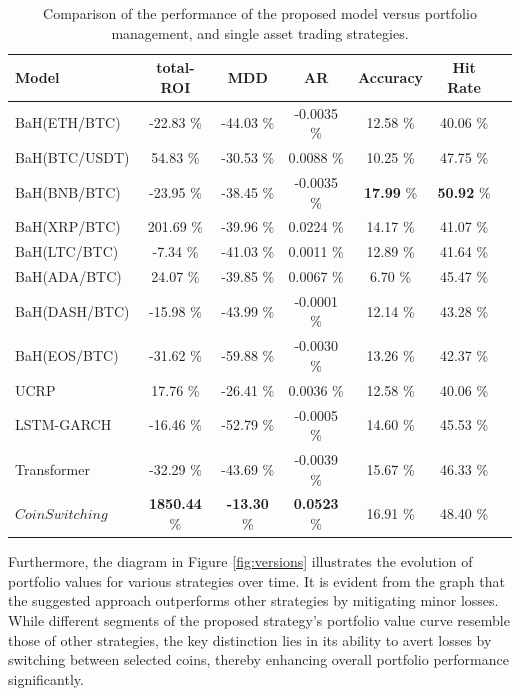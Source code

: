 \begin{table}[h]
	\centering
	\caption{Comparison of the performance of the proposed model versus portfolio management, and single asset trading strategies.}
	\label{tbl:cmp}
	\begin{tabular}{l| c | c | c | c | c | c  }
		 Model & total-ROI & MDD & AR & Accuracy & Hit Rate\\
		\hline
		\hline
		 BaH(ETH/BTC) & -22.83 \%  & -44.03 \% & -0.0035 \% & 12.58 \% & 40.06 \% \\
										 BaH(BTC/USDT) & 54.83 \%  & -30.53 \% &  0.0088 \% & 10.25 \% & 47.75 \% \\
										 BaH(BNB/BTC) & -23.95 \%  & -38.45 \% &  -0.0035 \% & \textbf{17.99} \% & \textbf{50.92} \% \\
										 BaH(XRP/BTC) & 201.69 \%  & -39.96 \% & 0.0224 \% & 14.17 \% & 41.07 \% \\
										 BaH(LTC/BTC) & -7.34 \%  & -41.03 \% &  0.0011 \% & 12.89 \% & 41.64 \% \\
										 BaH(ADA/BTC) & 24.07 \%  & -39.85 \% &  0.0067 \% & 6.70 \% & 45.47 \% \\
										 BaH(DASH/BTC) & -15.98 \%  & -43.99 \% &  -0.0001 \% & 12.14 \% & 43.28 \% \\
										 BaH(EOS/BTC) & -31.62 \%  & -59.88 \% & -0.0030 \% & 13.26 \% & 42.37 \% \\
									 	 UCRP & 17.76 \%  & -26.41 \% & 0.0036 \% & 12.58 \% & 40.06 \% \\
		\hline
		\hline
		 LSTM-GARCH & -16.46 \%  & -52.79 \% & -0.0005 \% & 14.60 \% & 45.53 \% \\
									 Transformer &  -32.29 \%  & -43.69 \% &  -0.0039 \% & 15.67 \% & 46.33 \% \\
		\hline
		\hline
		 $CoinSwitching$ &  \textbf{1850.44} \%  & \textbf{-13.30} \%  & \textbf{0.0523} \% & 16.91 \% & 48.40 \% \\
	\end{tabular}
\end{table}

Furthermore, the diagram in Figure \ref{fig:versions} illustrates the evolution of portfolio values for various strategies over time. It is evident from the graph that the suggested approach outperforms other strategies by mitigating minor losses. While different segments of the proposed strategy's portfolio value curve resemble those of other strategies, the key distinction lies in its ability to avert losses by switching between selected coins, thereby enhancing overall portfolio performance significantly.

